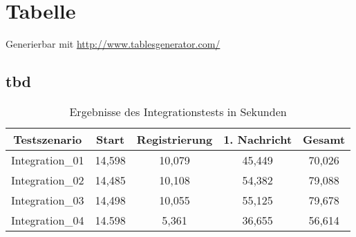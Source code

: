 
\chapter{Tabelle}

Generierbar mit \url{http://www.tablesgenerator.com/}

\section{tbd} 

\begin{table}[h]
\centering
\caption{Ergebnisse des Integrationstests in Sekunden}
\label{tab:integration}
\begin{tabular}{@{}ccccc@{}}
\toprule
Testszenario    & Start  & Registrierung & 1. Nachricht & \textbf{Gesamt} \\ \midrule
Integration\_01 & 14,598 & 10,079        & 45,449       & 70,026        \\
Integration\_02 & 14,485 & 10,108        & 54,382       & 79,088        \\
Integration\_03 & 14,498 & 10,055        & 55,125       & 79,678        \\
Integration\_04 & 14.598 & 5,361         & 36,655       & 56,614          \\ \bottomrule
\end{tabular}
\end{table}